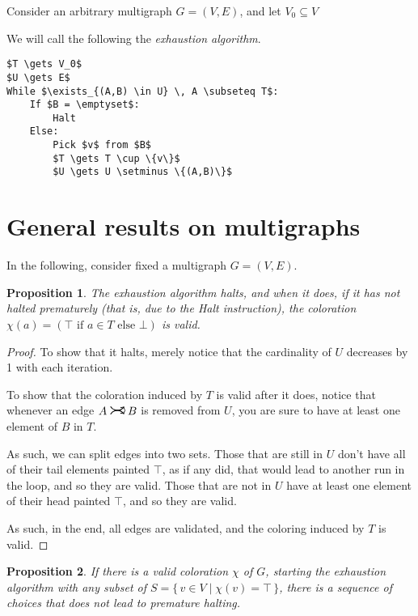 \documentclass[11pt]{article}
\newcommand{\rightcurvearrow}{
\mathrel{
  \begin{tikzpicture}[scale=0.8]
    \draw[thick,->] (0,1ex) arc (30:150:-2ex);
    \draw[thick,->] (0,-1ex) arc (150:30:2ex);
  \end{tikzpicture}
}
}
\newtheorem{prop}{Proposition}
\begin{document}
Consider an arbitrary multigraph $G = (V,E)$, and let $V_0 \subseteq V$

We will call the following the \emph{exhaustion algorithm}.

\begin{minipage}{\linewidth}
\begin{lstlisting}[mathescape]
$T \gets V_0$
$U \gets E$
While $\exists_{(A,B) \in U} \, A \subseteq T$:
    If $B = \emptyset$:
        Halt
    Else:
        Pick $v$ from $B$
        $T \gets T \cup \{v\}$
        $U \gets U \setminus \{(A,B)\}$
\end{lstlisting}
\end{minipage}


\section{General results on multigraphs}

In the following, consider fixed a multigraph $G = (V,E)$.

\begin{prop}
The exhaustion algorithm halts, and when it does, if it has not halted prematurely (that is, due to the Halt instruction), the coloration $\chi(a) = (\top \text{ if } a \in T \text{ else } \bot)$ is valid.
\end{prop}

\begin{proof}
To show that it halts, merely notice that the cardinality of $U$ decreases by 1 with each iteration.

To show that the coloration induced by $T$ is valid after it does, notice that whenever an edge $A \rightcurvearrow B$ is removed from $U$, you are sure to have at least one element of $B$ in $T$.

As such, we can split edges into two sets. Those that are still in $U$ don't have all of their tail elements painted $\top$, as if any did, that would lead to another run in the loop, and so they are valid. Those that are not in $U$ have at least one element of their head painted $\top$, and so they are valid.

As such, in the end, all edges are validated, and the coloring induced by $T$ is valid.
\end{proof}

\begin{prop}
If there is a valid coloration $\chi$ of $G$, starting the exhaustion algorithm with any subset of $S = \{ \, v \in V \mid \chi(v) = \top \, \}$, there is a sequence of choices that does not lead to premature halting.
\end{prop}
\end{document}
